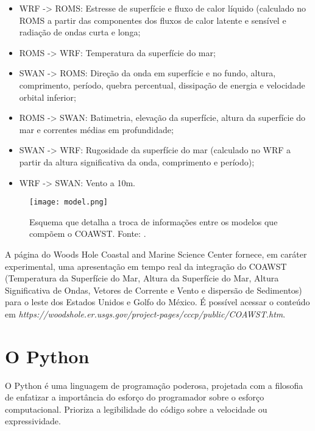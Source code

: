 \begin{itemize}
\item WRF -> ROMS: Estresse de superfície e fluxo de calor líquido (calculado no ROMS a partir das componentes dos fluxos de calor latente e sensível e radiação de ondas curta e longa;
\item ROMS -> WRF: Temperatura da superfície do mar;
\item SWAN -> ROMS: Direção da onda em superfície e no fundo, altura, comprimento, período, quebra percentual, dissipação de energia e velocidade orbital inferior;
\item ROMS -> SWAN: Batimetria, elevação da superfície, altura da superfície do mar e correntes médias em profundidade;
\item SWAN -> WRF: Rugosidade da superfície do mar (calculado no WRF a partir da altura significativa da onda, comprimento e período);
\item WRF -> SWAN: Vento a 10m.
\end{itemize}
\bigskip

\begin{figure}[H]
    \centering
    \captionsetup{justification=centering}
    \texttt{[image: model.png]}
    \caption{Esquema que detalha a troca de informações entre os modelos que compõem o COAWST. \newline Fonte: \textcite{Warner2018}.}
    \label{acopla}
\end{figure}
\bigskip

\noindent A página do Woods Hole Coastal and Marine Science Center fornece, em caráter experimental, uma apresentação em tempo real da integração do COAWST (Temperatura da Superfície do Mar, Altura da Superfície do Mar, Altura Significativa de Ondas, Vetores de Corrente e Vento e dispersão de Sedimentos) para o leste dos Estados Unidos e Golfo do México. É possível acessar o conteúdo em \textcolor{bleu_cite}{\textit{https://woodshole.er.usgs.gov/project-pages/cccp/public/COAWST.htm}}.

\section{O Python}
\bigskip

\noindent O Python é uma linguagem de programação poderosa, projetada com a filosofia de enfatizar a importância do esforço do programador sobre o esforço computacional. Prioriza a legibilidade do código sobre a velocidade ou expressividade.
\bigskip

